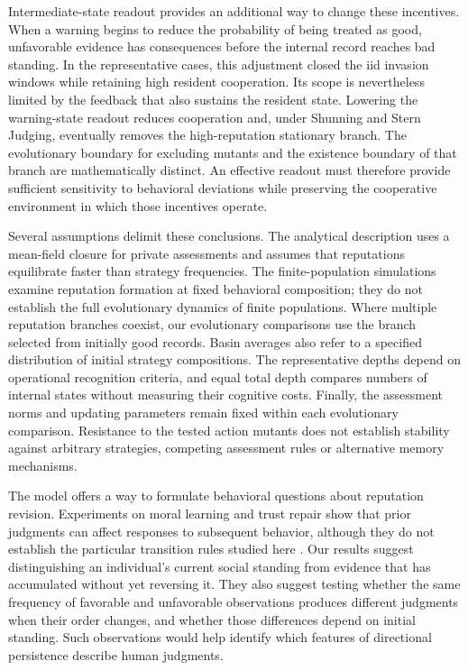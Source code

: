 \documentclass[fleqn,10pt]{wlscirep}
\begin{document}
Intermediate-state readout provides an additional way to change
these incentives. When a warning begins to reduce the probability
of being treated as good, unfavorable evidence has consequences
before the internal record reaches bad standing. In the representative
cases, this adjustment closed the iid invasion windows while
retaining high resident cooperation. Its scope is nevertheless
limited by the feedback that also sustains the resident state.
Lowering the warning-state readout reduces cooperation and, under
Shunning and Stern Judging, eventually removes the high-reputation
stationary branch. The evolutionary boundary for excluding mutants
and the existence boundary of that branch are mathematically distinct.
An effective readout must therefore provide sufficient sensitivity
to behavioral deviations while preserving the cooperative
environment in which those incentives operate.

Several assumptions delimit these conclusions. The analytical
description uses a mean-field closure for private assessments and
assumes that reputations equilibrate faster than strategy frequencies.
The finite-population simulations examine reputation formation at
fixed behavioral composition; they do not establish the full
evolutionary dynamics of finite populations. Where multiple
reputation branches coexist, our evolutionary comparisons use the
branch selected from initially good records. Basin averages also
refer to a specified distribution of initial strategy compositions.
The representative depths depend on operational recognition
criteria, and equal total depth compares numbers of internal states
without measuring their cognitive costs. Finally, the assessment
norms and updating parameters remain fixed within each evolutionary
comparison. Resistance to the tested action mutants does not
establish stability against arbitrary strategies, competing
assessment rules or alternative memory mechanisms.

The model offers a way to formulate behavioral questions about
reputation revision. Experiments on moral learning and trust repair
show that prior judgments can affect responses to subsequent
behavior, although they do not establish the particular transition
rules studied here \cite{siegel2018,schweitzer2006}. Our results
suggest distinguishing an individual's current social standing
from evidence that has accumulated without yet reversing it.
They also suggest testing whether the same frequency of favorable
and unfavorable observations produces different judgments when
their order changes, and whether those differences depend on
initial standing. Such observations would help identify which
features of directional persistence describe human judgments.
\end{document}
